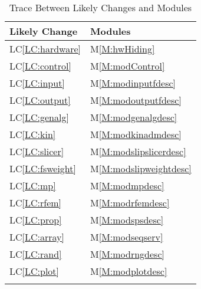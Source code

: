 \documentclass[12pt]{article}
\begin{document}
\begin{longtable}{l l}
\toprule
Likely Change & Modules
\\
\midrule
LC\ref{LC:hardware} & M\ref{M:hwHiding}
\\
LC\ref{LC:control} & M\ref{M:modControl}
\\
LC\ref{LC:input} & M\ref{M:modinputfdesc}
\\
LC\ref{LC:output} & M\ref{M:modoutputfdesc}
\\
LC\ref{LC:genalg} & M\ref{M:modgenalgdesc}
\\
LC\ref{LC:kin} & M\ref{M:modkinadmdesc}
\\
LC\ref{LC:slicer} & M\ref{M:modslipslicerdesc}
\\
LC\ref{LC:fsweight} & M\ref{M:modslipweightdesc}
\\
LC\ref{LC:mp} & M\ref{M:modmpdesc}
\\
LC\ref{LC:rfem} & M\ref{M:modrfemdesc}
\\
LC\ref{LC:prop} & M\ref{M:modspsdesc}
\\
LC\ref{LC:array} & M\ref{M:modseqserv}
\\
LC\ref{LC:rand} & M\ref{M:modrngdesc}
\\
LC\ref{LC:plot} & M\ref{M:modplotdesc}
\\
\bottomrule
\caption{Trace Between Likely Changes and Modules}
\label{Table:TracBetwLikeChanandModu}
\end{longtable}
\end{document}
